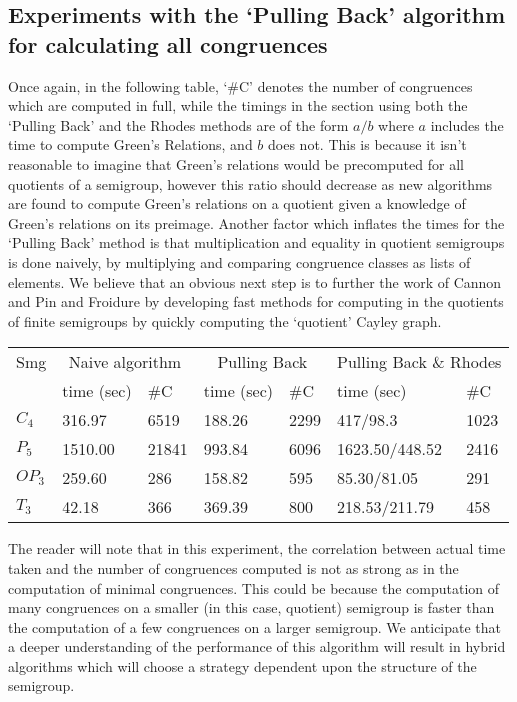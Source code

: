\documentclass{acmconf}
\begin{document}
\subsection{Experiments with the `Pulling Back' algorithm for 
calculating all congruences}
Once again, in the following table,
`\#C' denotes the number of congruences which
are computed in full, while the timings
in the section using both the `Pulling Back' and the Rhodes
methods are of the form $a/b$ where $a$ includes
the time to compute Green's Relations,  and $b$ does not. This is because it 
isn't  reasonable to imagine that Green's relations would be
precomputed for all quotients of a semigroup, however this ratio
should decrease as new algorithms are found to compute Green's relations
on a quotient given a knowledge of Green's relations on its preimage.
Another factor which inflates the times for the `Pulling Back' method 
is that multiplication and equality in quotient semigroups is done naively,
by multiplying  and comparing congruence classes as lists of elements.
We believe that an obvious next step is to further the work of Cannon
\cite{cannon} and Pin and Froidure \cite{pin} by developing 
fast methods for computing in the quotients of finite semigroups by
quickly computing the `quotient' Cayley graph.

\noindent
{\tiny
\begin{tabular}{|l|l|l|l|l|l|l|}
\hline
Smg &  \multicolumn{2}{c}{Naive algorithm} &
            \multicolumn{2}{c}{Pulling Back}&
						\multicolumn{2}{c}{Pulling Back \& Rhodes}\\
          & time (sec) & \#C & time (sec) & \#C 
          & time (sec) & \#C \\
\hline \hline
$C_4$ & 316.97 & 6519 & 188.26 & 2299 & 417/98.3 & 1023 \\
$P_5$ &1510.00 & 21841 & 993.84 & 6096 & 1623.50/448.52  & 2416  \\
$OP_3$ &259.60  &  286 & 158.82 & 595 &  85.30/81.05     & 291\\ 
$T_3$ &42.18  & 366 &  369.39 & 800 &  218.53/211.79  &  458\\ \hline
\end{tabular}}
The reader will note that in this experiment, the correlation between
actual time taken and the number of congruences computed is not as
strong as in the computation of minimal congruences. This could be because
the computation of many congruences on a smaller (in this case, quotient)
semigroup is faster than the computation of a few congruences on
a larger semigroup. We anticipate that a deeper understanding of 
the performance of this algorithm will result in hybrid algorithms
which will choose a strategy dependent upon the structure of the 
semigroup.
\end{document}
